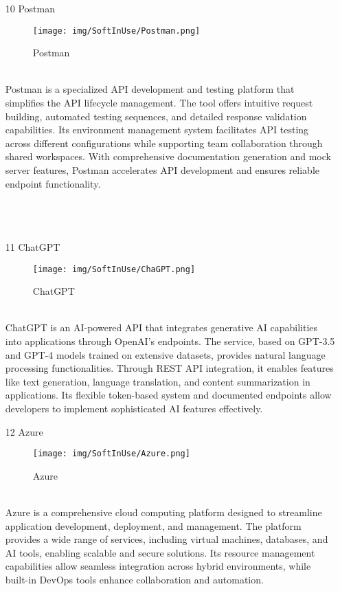 \documentclass[conference]{IEEEtran}
\begin{document}
\begin{enumerate}
\begin{itemize}
\begin{itemize}
\begin{enumerate}
\item[10] Postman
\begin{figure}[h]
\centering
\texttt{[image: img/SoftInUse/Postman.png]}
\caption{Postman} 
\end{figure}\\
Postman is a specialized API development and testing platform that simplifies the API lifecycle management. The tool offers intuitive request building, automated testing sequences, and detailed response validation capabilities. Its environment management system facilitates API testing across different configurations while supporting team collaboration through shared workspaces. With comprehensive documentation generation and mock server features, Postman accelerates API development and ensures reliable endpoint functionality.\\
\\
\\
\\
\item[11] ChatGPT
\begin{figure}[h]
\centering
\texttt{[image: img/SoftInUse/ChaGPT.png]}
\caption{ChatGPT} 
\end{figure}\\
ChatGPT is an AI-powered API that integrates generative AI capabilities into applications through OpenAI's endpoints. The service, based on GPT-3.5 and GPT-4 models trained on extensive datasets, provides natural language processing functionalities. Through REST API integration, it enables features like text generation, language translation, and content summarization in applications. Its flexible token-based system and documented endpoints allow developers to implement sophisticated AI features effectively.\\

\item[12] Azure
\begin{figure}[h]
\centering
\texttt{[image: img/SoftInUse/Azure.png]}
\caption{Azure} 
\end{figure}\\
Azure is a comprehensive cloud computing platform designed to streamline application development, deployment, and management. The platform provides a wide range of services, including virtual machines, databases, and AI tools, enabling scalable and secure solutions. Its resource management capabilities allow seamless integration across hybrid environments, while built-in DevOps tools enhance collaboration and automation.
\clearpage


\end{enumerate}
\end{itemize}
\end{itemize}
\end{enumerate}
\end{document}
